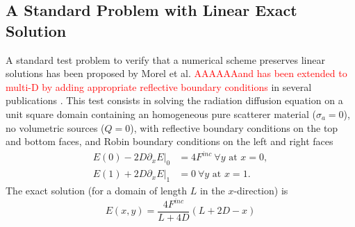 \documentclass[preprint,10pt]{elsarticle}
\newcommand{\tcr}[1]{\textcolor{red}{#1}}
\begin{document}
\subsection{A Standard Problem with Linear Exact Solution}
A standard test problem to verify that a numerical scheme preserves linear solutions has been
proposed by Morel et al. \cite{Morel1992} \tcr{AAAAAAand has been extended to multi-D by adding 
appropriate reflective boundary conditions} in several publications \cite{aaa}. This test consists
in solving the radiation diffusion equation on a unit square domain containing an homogeneous pure 
scatterer material ($\sigma_a=0$), no volumetric sources ($Q=0$), with reflective boundary conditions 
on the top and bottom faces, and Robin boundary conditions on the left and right faces
\begin{align}
  E(0) - 2 D \left.\partial_x E\right|_0 &= 4F^{inc} \ \forall y \textrm{ at } x=0, \\
  E(1) + 2 D \left.\partial_x E\right|_1 &= 0 \ \forall y \textrm{ at } x=1.
\end{align}
The exact solution (for a domain of length $L$ in the $x$-direction) is
\begin{equation}
E(x,y) = 	\frac{4F^{inc}}{L+4D}\left(L+2D-x \right)
\end{equation}
\end{document}
